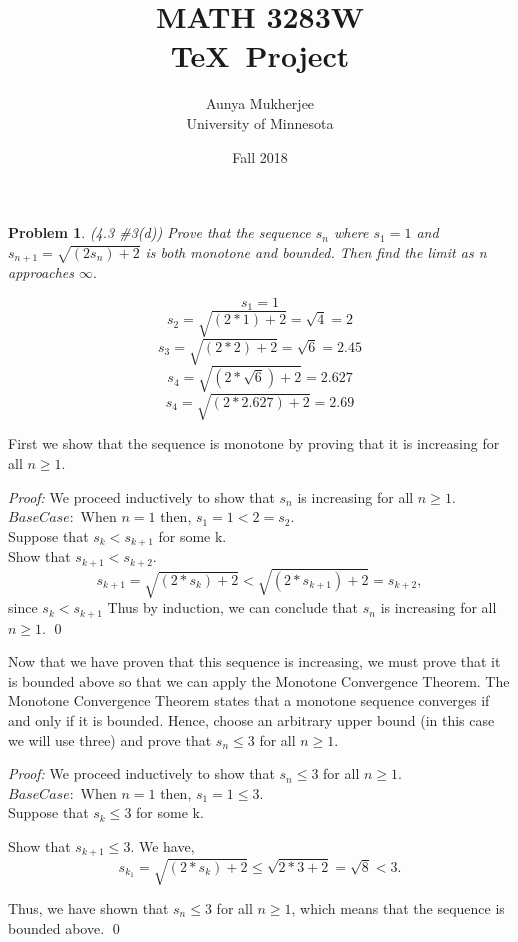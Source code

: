 \documentclass{article}
\title{MATH 3283W \\ \TeX\ Project}
\author{Aunya Mukherjee\\University of Minnesota}
\date{Fall 2018}
\newtheorem*{problem}{Problem}
\begin{document}
\maketitle

\begin{problem}{(4.3 \#3(d))} Prove that the sequence $s_n$ where $s_1 = 1$ and  \\
$s_{n+1} = \sqrt{(2s_n) + 2}$ is both monotone and bounded. Then find the limit as n approaches $\infty.$

\end{problem}

$$s_1 = 1$$
$$s_2 = \sqrt{(2 *1) + 2} = \sqrt{4} = 2$$
$$s_3 = \sqrt{(2 *2) + 2} = \sqrt{6} = 2.45$$
$$s_4 = \sqrt{(2 *\sqrt{6}) + 2} = 2.627$$
$$s_4 = \sqrt{(2 *2.627) + 2} = 2.69$$

\bigskip

First we show that the sequence is monotone by proving that it is increasing for all $n\geq1.$

\bigskip

{\it Proof:} We proceed inductively to show that $s_n$ is increasing for all $n\geq1.$
$Base Case:$ When $n=1$ then, $s_1 = 1 < 2 = s_2.$ \\
Suppose that $s_k < s_{k+1}$ for some k. \\
Show that $s_{k+1} < s_{k+2}.$
$$s_{k+1}=\sqrt{(2*s_k) + 2} < \sqrt{(2*s_{k+1}) + 2}=s_{k+2},$$ since $s_k < s_{k+1}$
Thus by induction, we can conclude that $s_n$ is increasing for all $n\geq1.$
\qed

\bigskip

Now that we have proven that this sequence is increasing, we must prove that it is bounded above so that we can apply the Monotone Convergence Theorem.
The Monotone Convergence Theorem states that a monotone sequence converges if and only if it is bounded.
Hence, choose an arbitrary upper bound (in this case we will use three) and prove that $s_n \leq 3$ for all $n\geq1.$
\bigskip

{\it Proof:} We proceed inductively to show that $s_n \leq 3$ for all $n\geq1.$ \\
$Base Case:$ When $n=1$ then, $s_1 = 1 \leq3.$ \\
Suppose that $s_k \leq3$ for some k.

Show that $s_{k+1} \leq3.$ We have,
$$s_{k_1} = \sqrt{(2*s_k) + 2} \leq \sqrt{2*3 +2} = \sqrt{8} < 3.$$

Thus, we have shown that $s_n\leq3$ for all $n\geq1$, which means that the sequence is bounded above.
\qed
\end{document}
